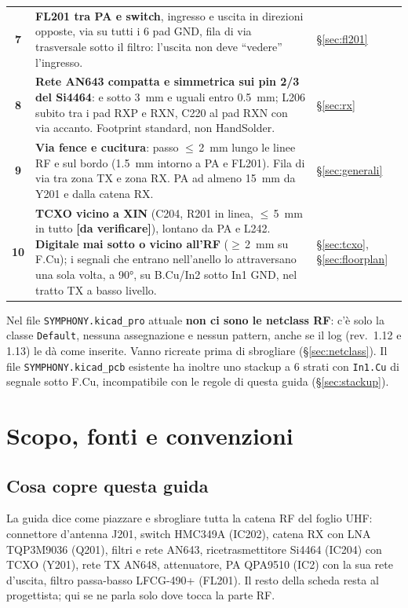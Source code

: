\documentclass[a4paper,10pt]{article}
\newcommand{\net}[1]{\texttt{\detokenize{#1}}}
\newcommand{\dv}{\textcolor{verfr}{\textbf{[da verificare]}}}
\begin{document}
{\begin{tabularx}{\linewidth}{@{}>{\sffamily\bfseries\color{sbblue}}c Y L{30mm}@{}}
7 & \textbf{FL201 tra PA e switch}, ingresso e uscita in direzioni opposte, via su tutti i 6 pad GND, fila di via trasversale sotto il filtro: l'uscita non deve \enquote{vedere} l'ingresso. & \S\ref{sec:fl201}\\
8 & \textbf{Rete AN643 compatta e simmetrica sui pin 2/3 del Si4464}: \net{RF_RX_P} e \net{RF_RX_N} sotto \SI{3}{mm} e uguali entro \SI{0.5}{mm}; L206 subito tra i pad RXP e RXN, C220 al pad RXN con via accanto. Footprint standard, non HandSolder. & \S\ref{sec:rx}\\
9 & \textbf{Via fence e cucitura}: passo $\le$\,\SI{2}{mm} lungo le linee RF e sul bordo (\SI{1.5}{mm} intorno a PA e FL201). Fila di via tra zona TX e zona RX. PA ad almeno \SI{15}{mm} da Y201 e dalla catena RX. & \S\ref{sec:generali}\\
10 & \textbf{TCXO vicino a XIN} (C204, R201 in linea, $\le$\,\SI{5}{mm} in tutto \dv), lontano da PA e L242. \textbf{Digitale mai sotto o vicino all'RF} ($\ge$\,\SI{2}{mm} su F.Cu); i segnali che entrano nell'anello lo attraversano una sola volta, a \ang{90}, su B.Cu/In2 sotto In1 GND, nel tratto TX a basso livello. & \S\ref{sec:tcxo}, \S\ref{sec:floorplan}\\
\bottomrule
\end{tabularx}}

\medskip
\begin{attenzione}
Nel file \texttt{SYMPHONY.kicad\_pro} attuale \textbf{non ci sono le netclass RF}: c'è solo la classe
\texttt{Default}, nessuna assegnazione e nessun pattern, anche se il log (rev.~1.12 e 1.13) le dà come
inserite. Vanno ricreate prima di sbrogliare (\S\ref{sec:netclass}). Il file \texttt{SYMPHONY.kicad\_pcb}
esistente ha inoltre uno stackup a 6 strati con \texttt{In1.Cu} di segnale sotto F.Cu, incompatibile con
le regole di questa guida (\S\ref{sec:stackup}).
\end{attenzione}

\clearpage
\section{Scopo, fonti e convenzioni}
\label{sec:intro}

\subsection{Cosa copre questa guida}
La guida dice come piazzare e sbrogliare tutta la catena RF del foglio UHF: connettore d'antenna J201,
switch HMC349A (IC202), catena RX con LNA TQP3M9036 (Q201), filtri e rete AN643, ricetrasmettitore
Si4464 (IC204) con TCXO (Y201), rete TX AN648, attenuatore, PA QPA9510 (IC2) con la sua rete d'uscita,
filtro passa-basso LFCG-490+ (FL201). Il resto della scheda resta al progettista; qui se ne parla solo
dove tocca la parte RF.
\end{document}
